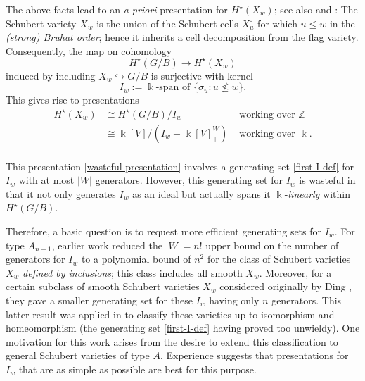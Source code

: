 \documentclass[12pt,dvips]{amsart}
\theoremstyle{plain}
\theoremstyle{definition}
\theoremstyle{remark}
\numberwithin{equation}{section}
\def\ZZ{{\mathbb Z}}
\begin{document}
The above facts lead to an {\it a priori} presentation
for $H^\star(X_w)$; see also \cite[Cor. 4.4]{Carrell} and
\cite[Prop. 2.1]{GasharovReiner}:  The Schubert variety $X_w$ is the
union of the Schubert cells $X_u^\circ$ for which $u \leq w$ in the
{\it (strong) Bruhat order}; hence it inherits a cell decomposition
from the flag variety.  Consequently, the map on cohomology
$$
H^\star(G/B) \rightarrow H^\star(X_w)
$$
induced by including $X_w \hookrightarrow G/B$ is surjective 
with kernel 
\begin{equation}
\label{first-I-def}
I_w:=\Bbbk\text{-span of }\{ \sigma_u: u \not\leq w \}.
\end{equation}
This gives rise to presentations
\begin{equation}
\label{wasteful-presentation}
\begin{aligned}
H^\star(X_w) &\cong  H^\star(G/B)/I_w &\text{ working over }\ZZ\\ 
         &\cong  \Bbbk[V]/\left( I_w + \Bbbk[V]^W_+ \right)&
\text{ working over }\Bbbk.\\ 
\end{aligned}
\end{equation}

This presentation \eqref{wasteful-presentation} involves a generating set \eqref{first-I-def}
for $I_w$ with at most $|W|$ generators.  However, this generating set
for $I_w$ is wasteful in that it not only generates $I_w$ as an ideal but
actually spans it $\Bbbk$-\emph{linearly} within $H^\star(G/B)$. 

Therefore, a basic question is to request more efficient generating
sets for $I_w$.  For type $A_{n-1}$, earlier work
\cite{GasharovReiner} reduced the $|W|=n!$ upper bound on the number
of generators for $I_w$ to a polynomial bound of $n^2$ for the class
of Schubert varieties $X_w$ \emph{defined by inclusions}; this class
includes all smooth $X_w$. Moreover, for a certain subclass of smooth
Schubert varieties $X_w$ considered originally by Ding
\cite{Ding1,Ding2}, they gave a smaller generating set for these $I_w$
having only $n$ generators.  This latter result was applied in
\cite{DevelinMartinReiner} to classify these varieties up to
isomorphism and homeomorphism (the generating set \eqref{first-I-def}
having proved too unwieldy). One motivation for this work arises from
the desire to extend this classification to general Schubert varieties of
type $A$.  Experience suggests that presentations for $I_w$ that are
as simple as possible are best for this purpose.
\end{document}
